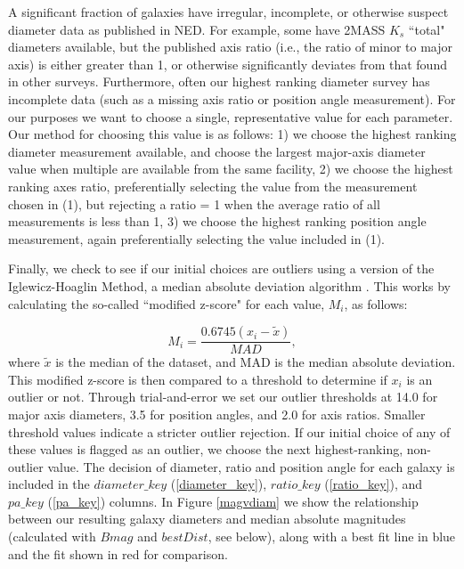 \documentclass[twocolumn,tighten]{aastex62}
\begin{document}
A significant fraction of galaxies have irregular, incomplete, or otherwise suspect diameter data as published in NED. For example, some have 2MASS $K_s$ ``total" diameters available, but the published axis ratio (i.e., the ratio of minor to major axis) is either greater than 1, or otherwise significantly deviates from that found in other surveys. Furthermore, often our highest ranking diameter survey has incomplete data (such as a missing axis ratio or position angle measurement). For our purposes we want to choose a single, representative value for each parameter. Our method for choosing this value is as follows: 1) we choose the highest ranking diameter measurement available, and choose the largest major-axis diameter value when multiple are available from the same facility, 2) we choose the highest ranking axes ratio, preferentially selecting the value from the measurement chosen in (1), but rejecting a ratio = 1 when the average ratio of all measurements is less than 1, 3) we choose the highest ranking position angle measurement, again preferentially selecting the value included in (1).

Finally, we check to see if our initial choices are outliers using a version of the Iglewicz-Hoaglin Method, a median absolute deviation algorithm \citep{iglewicz1993}. This works by calculating the so-called ``modified z-score" for each value, $M_i$, as follows:

\begin{equation}
M_{i} = \frac{0.6745 (x_i - \tilde{x})}{MAD},
\end{equation}
\noindent where $\tilde{x}$ is the median of the dataset, and MAD is the median absolute deviation. This modified z-score is then compared to a threshold to determine if $x_i$ is an outlier or not. Through trial-and-error we set our outlier thresholds at 14.0 for major axis diameters, 3.5 for position angles, and 2.0 for axis ratios. Smaller threshold values indicate a stricter outlier rejection. If our initial choice of any of these values is flagged as an outlier, we choose the next highest-ranking, non-outlier value. The decision of diameter, ratio and position angle for each galaxy is included in the $diameter\_key$ (\ref{diameter_key}), $ratio\_key$ (\ref{ratio_key}), and $pa\_key$ (\ref{pa_key}) columns. In Figure \ref{magvdiam} we show the relationship between our resulting galaxy diameters and median absolute magnitudes (calculated with $Bmag$ and $bestDist$, see below), along with a best fit line in blue and the \cite{wakker2009} fit shown in red for comparison.
\end{document}
